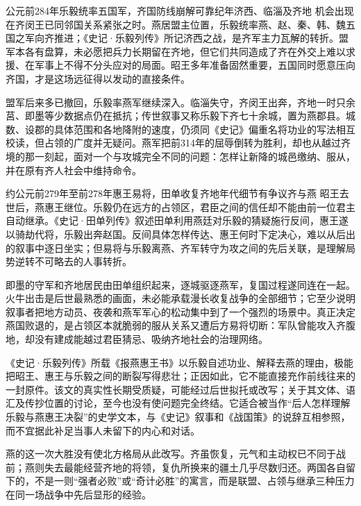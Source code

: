 \begin{event}{公元前284年}{乐毅统率五国军，齐国防线崩解}{可靠纪年}{济西、临淄及齐地}
机会出现在齐闵王已同邻国关系紧张之时。燕居盟主位置，乐毅统率燕、赵、秦、韩、魏五国之军向齐推进；《史记·乐毅列传》所记济西之战，是齐军主力瓦解的转折。盟军本各有盘算，未必愿把兵力长期留在齐地，但它们共同造成了齐在外交上难以求援、在军事上不得不分头应对的局面。昭王多年准备固然重要，五国同时愿意压向齐国，才是这场远征得以发动的直接条件。

盟军后来多已撤回，乐毅率燕军继续深入。临淄失守，齐闵王出奔，齐地一时只余莒、即墨等少数据点仍在抵抗；传世叙事又称乐毅下齐七十余城，置为燕郡县。城数、设郡的具体范围和各地降附的速度，仍须同《史记》偏重名将功业的写法相互校读，但占领的广度并无疑问。燕军把前314年的屈辱倒转为胜利，却也从越过齐境的那一刻起，面对一个与攻城完全不同的问题：怎样让新降的城邑缴纳、服从，并在原有齐人社会中维持命令。
\end{event}

\begin{event}{约公元前279年至前278年}{惠王易将，田单收复齐地}{年代细节有争议}{齐与燕}
昭王去世后，燕惠王继位。乐毅仍在远方的占领区，君臣之间的信任却不能由前一位君主自动继承。《史记·田单列传》叙述田单利用燕廷对乐毅的猜疑施行反间，惠王遂以骑劫代将，乐毅出奔赵国。反间具体怎样传达、惠王何时下定决心，难以从后出的叙事中逐日坐实；但易将与乐毅离燕、齐军转守为攻之间的先后关联，是理解局势逆转不可略去的人事转折。

即墨的守军和齐地居民由田单组织起来，逐城驱逐燕军，复国过程遂同连在一起。火牛出击是后世最熟悉的画面，未必能承载漫长收复战争的全部细节；它至少说明叙事者把地方动员、夜袭和燕军军心的松动集中到了一个强烈的场景中。真正决定燕国败退的，是占领区本就脆弱的服从关系又遭后方易将切断：军队曾能攻入齐腹地，却没有建成能越过君臣猜忌、吸纳齐地社会的治理网络。
\end{event}

\begin{sourcenote}[乐毅书信与燕国故事]
《史记·乐毅列传》所载《报燕惠王书》以乐毅自述功业、解释去燕的理由，极能把昭王、惠王与乐毅之间的断裂写得悲壮；正因如此，它不能直接充作前线往来的一封原件。该文的真实性长期受质疑，可能经过后世拟托或改写；关于其文体、语汇及传抄位置的讨论，至今也没有使问题完全终结。它适合被当作“后人怎样理解乐毅与燕惠王决裂”的史学文本，与《史记》叙事和《战国策》的说辞互相参照，而不宜据此补足当事人未留下的内心和对话。
\end{sourcenote}

燕的这一次大胜没有使北方格局从此改写。齐虽恢复，元气和主动权已不同于战前；燕则失去最能经营齐地的将领，复仇所换来的疆土几乎尽数归还。两国各自留下的，不是一则“强者必败”或“奇计必胜”的寓言，而是联盟、占领与继承三种压力在同一场战争中先后显形的经验。

